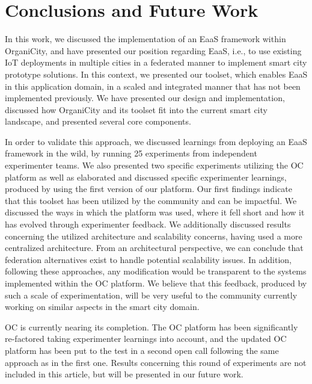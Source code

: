 
\section{Conclusions and Future Work}
\label{sec:con}

In this work, we discussed the implementation of an EaaS framework within OrganiCity, and have presented our position regarding EaaS, i.e., to use existing IoT deployments in multiple cities in a federated manner to implement smart city prototype solutions. In this context, we presented our toolset, which enables EaaS in this application domain, in a scaled and integrated manner that has not been implemented previously. We have presented our design and implementation, discussed how OrganiCity and its toolset fit into the current smart city landscape, and presented several core components.

In order to validate this approach, we discussed learnings from deploying an EaaS framework in the wild, by running 25 experiments from independent experimenter teams. We also presented two specific experiments utilizing the OC platform as well as elaborated and discussed specific experimenter learnings, produced by using the first version of our platform. Our first findings indicate that this toolset has been utilized by the community and can be impactful. We discussed the ways in which the platform was used, where it fell short and how it has evolved through experimenter feedback. We additionally discussed results concerning the utilized architecture and scalability concerns, having used a more centralized architecture. From an architectural perspective, we can conclude that federation alternatives exist to handle potential scalability issues. In addition, following these approaches, any modification would be transparent to the systems implemented within the OC platform. We believe that this feedback, produced by such a scale of experimentation, will be very useful to the community currently working on similar aspects in the smart city domain.

OC is currently nearing its completion. The OC platform has been significantly re-factored taking experimenter learnings into account, and the updated OC platform has been put to the test in a second open call following the same approach as in the first one. Results concerning this round of experiments are not included in this article, but will be presented in our future work. 
